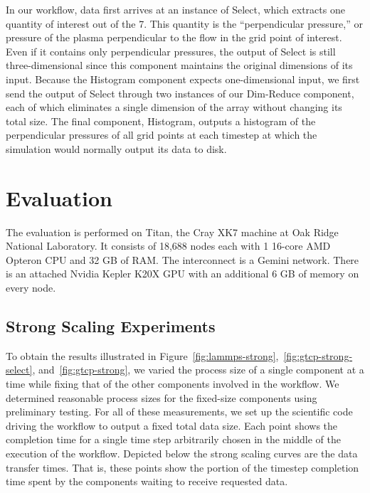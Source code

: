 \documentclass[conference]{IEEEtran}
\begin{document}
In our workflow, data first arrives at an instance of Select, which extracts
one quantity of interest out of the 7. This quantity is the ``perpendicular
pressure,'' or pressure of the plasma perpendicular to the flow in the grid
point of interest. Even if it contains only perpendicular pressures, the output
of Select is still three-dimensional since this component maintains the
original dimensions of its input. Because the Histogram component expects
one-dimensional input, we first send the output of Select through two instances
of our Dim-Reduce component, each of which eliminates a single dimension of the
array without changing its total size. The final component, Histogram, outputs
a histogram of the perpendicular pressures of all grid points at each timestep
at which the simulation would normally output its data to disk.

\section{Evaluation}
\label{s:eval}

The evaluation is performed on Titan, the Cray XK7 machine at Oak Ridge
National Laboratory. It consists of 18,688 nodes each with 1 16-core AMD
Opteron CPU and 32 GB of RAM. The interconnect is a Gemini network. There is an
attached Nvidia Kepler K20X GPU with an additional 6 GB of memory on every
node.


\subsection{Strong Scaling Experiments}

To obtain the results illustrated in
Figure~\ref{fig:lammps-strong},~\ref{fig:gtcp-strong-select},
and~\ref{fig:gtcp-strong}, we varied the process size of a single component at
a time while fixing that of the other components involved in the workflow.  We
determined reasonable process sizes for the fixed-size components using
preliminary testing. For all of these measurements, we set up the scientific
code driving the workflow to output a fixed total data size. Each point shows
the completion time for a single time step arbitrarily chosen in the middle of
the execution of the workflow. Depicted below the strong scaling curves are the
data transfer times. That is, these points show the portion of the timestep
completion time spent by the components waiting to receive requested data.
\end{document}

